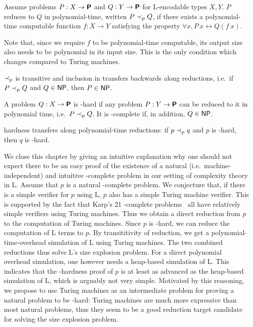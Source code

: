 \begin{definition}
  Assume problems $P : X \rightarrow \textsf{\bfseries P}$ and $Q : Y \rightarrow \textsf{\bfseries P}$ for L-encodable types $X, Y$. $P$ reduces to $Q$ in polynomial-time, written $P \prec_p{} Q$, if there exists a polynomial-time computable function $f : X \rightarrow Y$ satisfying the property $\forall x, P~x \leftrightarrow Q(f~x)$. 
\end{definition}
Note that, since we require $f$ to be polynomial-time computable, its output size also needs to be polynomial in its input size. This is the only condition which changes compared to Turing machines.

$\prec_p$ is transitive and inclusion in \NP{} transfers backwards along reductions, i.e.\ if $P \prec_p{} Q$ and $Q \in \normalfont\textsf{NP}{}$, then $P \in \textsf{NP}{}$.

\begin{definition}
  A problem $Q : X \rightarrow \textsf{\bfseries P}$ is \NP{}-hard if any problem $P : Y \rightarrow \textsf{\bfseries P}$ can be reduced to it in polynomial time, i.e.\ $P \prec_p{} Q$. It is \NP{}-complete if, in addition, $Q \in \normalfont\textsf{NP}{}$.
\end{definition}

\NP{} hardness transfers along polynomial-time reductions: if $p \prec_p{} q$ and $p$ is \NP{}-hard, then $q$ is \NP{}-hard.

\begin{remark}\label{rem:cook_L}
We close this chapter by giving an intuitive explanation why one should not expect there to be an easy proof of the existence of a natural (i.e.\ machine-independent) and intuitive \NP{}-complete problem in our setting of complexity theory in L.
Assume that $p$ is a natural \NP{}-complete problem. We conjecture that, if there is a simple verifier for $p$ using L, $p$ also has a simple Turing machine verifier. This is supported by the fact that Karp's 21 \NP{}-complete problems~\cite{Karp1972} all have relatively simple verifiers using Turing machines.
Thus we obtain a direct reduction from $p$ to the computation of Turing machines. 
Since $p$ is \NP{}-hard, we can reduce the computation of L terms to $p$. By transititivity of reduction, we get a polynomial-time-overhead simulation of L using Turing machines. The two combined reductions thus solve L's size explosion problem. 
For a direct polynomial overhead simulation, one however needs a heap-based simulation of L.
This indicates that the \NP{}-hardness proof of $p$ is at least as advanced as the heap-based simulation of L, which is arguably not very simple.
Motivated by this reasoning, we propose to use Turing machines as an intermediate problem for proving a natural problem to be \NP{}-hard: Turing machines are much more expressive than most natural problems, thus they seem to be a good reduction target candidate for solving the size explosion problem.
\end{remark}
